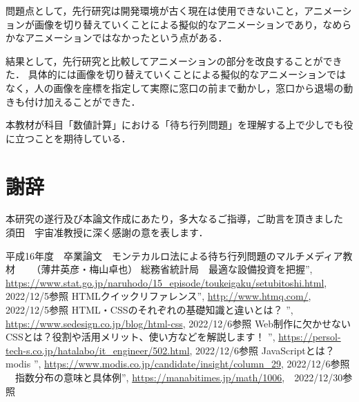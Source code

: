 \documentclass[12pt,a4j]{ltjsarticle}
\begin{document}
問題点として，先行研究は開発環境が古く現在は使用できないこと，アニメーションが画像を切り替えていくことによる擬似的なアニメーションであり，なめらかなアニメーションではなかったという点がある．

結果として，先行研究と比較してアニメーションの部分を改良することができた．
具体的には画像を切り替えていくことによる擬似的なアニメーションではなく，人の画像を座標を指定して実際に窓口の前まで動かし，窓口から退場の動きも付け加えることができた．

本教材が科目「数値計算」における「待ち行列問題」を理解する上で少しでも役に立つことを期待している．

\clearpage

\section{謝辞}
本研究の遂行及び本論文作成にあたり，多大なるご指導，ご助言を頂きました  須田　宇宙准教授に深く感謝の意を表します．
\clearpage

\begin{thebibliography}{99}
	平成16年度　卒業論文　モンテカルロ法による待ち行列問題のマルチメディア教材 　
	（薄井英彦・梅山卓也）
	 総務省統計局　最適な設備投資を把握”, \url{https://www.stat.go.jp/naruhodo/15_episode/toukeigaku/setubitoshi.html}, 2022/12/5参照
	 HTMLクイックリファレンス”, \url{http://www.htmq.com/}, 2022/12/5参照
	HTML・CSSのそれぞれの基礎知識と違いとは？ ”, \url{https://www.sedesign.co.jp/blog/html-css}, 2022/12/6参照
	Web制作に欠かせないCSSとは？役割や活用メリット、使い方などを解説します！ ”, \url{https://persol-tech-s.co.jp/hatalabo/it_engineer/502.html}, 2022/12/6参照
	JavaScriptとは？　modis ”, \url{https://www.modis.co.jp/candidate/insight/column_29}, 2022/12/6参照
	　指数分布の意味と具体例”,  \url{https://manabitimes.jp/math/1006},　2022/12/30参照
\end{thebibliography}
\end{document}

